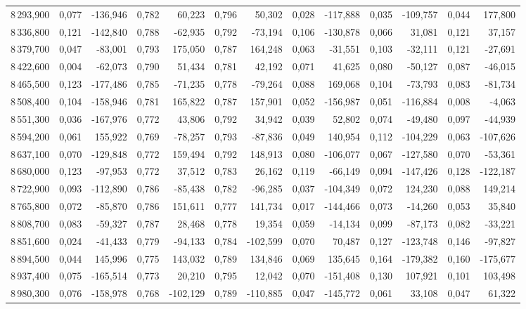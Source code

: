 \begin{longtable}{rrrrrrrrrrrrr}
8\,293,900 & 0,077 & -136,946 & 0,782 & 60,223 & 0,796 & 50,302 & 0,028 & -117,888 & 0,035 & -109,757 & 0,044 & 177,800\\
8\,336,800 & 0,121 & -142,840 & 0,788 & -62,935 & 0,792 & -73,194 & 0,106 & -130,878 & 0,066 & 31,081 & 0,121 & 37,157\\
8\,379,700 & 0,047 & -83,001 & 0,793 & 175,050 & 0,787 & 164,248 & 0,063 & -31,551 & 0,103 & -32,111 & 0,121 & -27,691\\
8\,422,600 & 0,004 & -62,073 & 0,790 & 51,434 & 0,781 & 42,192 & 0,071 & 41,625 & 0,080 & -50,127 & 0,087 & -46,015\\
8\,465,500 & 0,123 & -177,486 & 0,785 & -71,235 & 0,778 & -79,264 & 0,088 & 169,068 & 0,104 & -73,793 & 0,083 & -81,734\\
8\,508,400 & 0,104 & -158,946 & 0,781 & 165,822 & 0,787 & 157,901 & 0,052 & -156,987 & 0,051 & -116,884 & 0,008 & -4,063\\
8\,551,300 & 0,036 & -167,976 & 0,772 & 43,806 & 0,792 & 34,942 & 0,039 & 52,802 & 0,074 & -49,480 & 0,097 & -44,939\\
8\,594,200 & 0,061 & 155,922 & 0,769 & -78,257 & 0,793 & -87,836 & 0,049 & 140,954 & 0,112 & -104,229 & 0,063 & -107,626\\
8\,637,100 & 0,070 & -129,848 & 0,772 & 159,494 & 0,792 & 148,913 & 0,080 & -106,077 & 0,067 & -127,580 & 0,070 & -53,361\\
8\,680,000 & 0,123 & -97,953 & 0,772 & 37,512 & 0,783 & 26,162 & 0,119 & -66,149 & 0,094 & -147,426 & 0,128 & -122,187\\
8\,722,900 & 0,093 & -112,890 & 0,786 & -85,438 & 0,782 & -96,285 & 0,037 & -104,349 & 0,072 & 124,230 & 0,088 & 149,214\\
8\,765,800 & 0,072 & -85,870 & 0,786 & 151,611 & 0,777 & 141,734 & 0,017 & -144,466 & 0,073 & -14,260 & 0,053 & 35,840\\
8\,808,700 & 0,083 & -59,327 & 0,787 & 28,468 & 0,778 & 19,354 & 0,059 & -14,134 & 0,099 & -87,173 & 0,082 & -33,221\\
8\,851,600 & 0,024 & -41,433 & 0,779 & -94,133 & 0,784 & -102,599 & 0,070 & 70,487 & 0,127 & -123,748 & 0,146 & -97,827\\
8\,894,500 & 0,044 & 145,996 & 0,775 & 143,032 & 0,789 & 134,846 & 0,069 & 135,645 & 0,164 & -179,382 & 0,160 & -175,677\\
8\,937,400 & 0,075 & -165,514 & 0,773 & 20,210 & 0,795 & 12,042 & 0,070 & -151,408 & 0,130 & 107,921 & 0,101 & 103,498\\
8\,980,300 & 0,076 & -158,978 & 0,768 & -102,129 & 0,789 & -110,885 & 0,047 & -145,772 & 0,061 & 33,108 & 0,047 & 61,322\\

\end{longtable}

